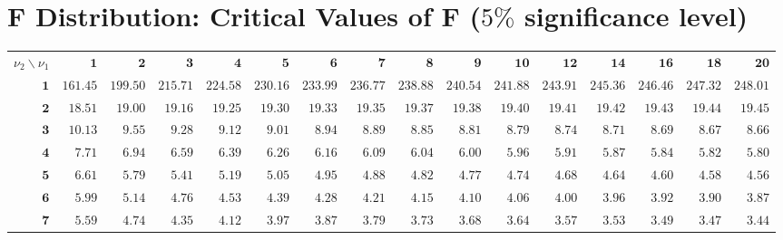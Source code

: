 \section{F Distribution: Critical Values of F ($5\%$ significance level)}


\renewcommand{\arraystretch}{1.4}
\changefontsizes{6pt}
\begin{longtable}{|r|r|r|r|r|r|r|r|r|r|r|r|r|r|r|r|}
    \hline
    \rowcolor{gray!30}
    \multicolumn{16}{|c|}{F Distribution: Critical Values of F ($5\%$ significance level)} \\
    \hline
    \rowcolor{gray!30}
    ${\nu_2}\backslash{\nu_1}$   & \(\mathbf{1}\) & \(\mathbf{2}\) & \(\mathbf{3}\) & \(\mathbf{4}\) & \(\mathbf{5}\) & \(\mathbf{6}\) & \(\mathbf{7}\) & \(\mathbf{8}\) & \(\mathbf{9}\) & \(\mathbf{10}\) & \(\mathbf{12}\) & \(\mathbf{14}\) & \(\mathbf{16}\) & \(\mathbf{18}\) & \(\mathbf{20}\) \\ \hline
    \(\mathbf{1}\) & \(161.45\) & \(199.50\) & \(215.71\) & \(224.58\) & \(230.16\) & \(233.99\) & \(236.77\) & \(238.88\) & \(240.54\) & \(241.88\) & \(243.91\) & \(245.36\) & \(246.46\) & \(247.32\) & \(248.01\) \\ \hline
    \(\mathbf{2}\) & \(18.51\) & \(19.00\) & \(19.16\) & \(19.25\) & \(19.30\) & \(19.33\) & \(19.35\) & \(19.37\) & \(19.38\) & \(19.40\) & \(19.41\) & \(19.42\) & \(19.43\) & \(19.44\) & \(19.45\) \\ \hline
    \(\mathbf{3}\) & \(10.13\) & \(9.55\) & \(9.28\) & \(9.12\) & \(9.01\) & \(8.94\) & \(8.89\) & \(8.85\) & \(8.81\) & \(8.79\) & \(8.74\) & \(8.71\) & \(8.69\) & \(8.67\) & \(8.66\) \\ \hline
    \(\mathbf{4}\) & \(7.71\) & \(6.94\) & \(6.59\) & \(6.39\) & \(6.26\) & \(6.16\) & \(6.09\) & \(6.04\) & \(6.00\) & \(5.96\) & \(5.91\) & \(5.87\) & \(5.84\) & \(5.82\) & \(5.80\) \\ \hline
    \(\mathbf{5}\) & \(6.61\) & \(5.79\) & \(5.41\) & \(5.19\) & \(5.05\) & \(4.95\) & \(4.88\) & \(4.82\) & \(4.77\) & \(4.74\) & \(4.68\) & \(4.64\) & \(4.60\) & \(4.58\) & \(4.56\) \\ \hline
    \(\mathbf{6}\) & \(5.99\) & \(5.14\) & \(4.76\) & \(4.53\) & \(4.39\) & \(4.28\) & \(4.21\) & \(4.15\) & \(4.10\) & \(4.06\) & \(4.00\) & \(3.96\) & \(3.92\) & \(3.90\) & \(3.87\) \\ \hline
    \(\mathbf{7}\) & \(5.59\) & \(4.74\) & \(4.35\) & \(4.12\) & \(3.97\) & \(3.87\) & \(3.79\) & \(3.73\) & \(3.68\) & \(3.64\) & \(3.57\) & \(3.53\) & \(3.49\) & \(3.47\) & \(3.44\) \\ \hline

\end{longtable}
